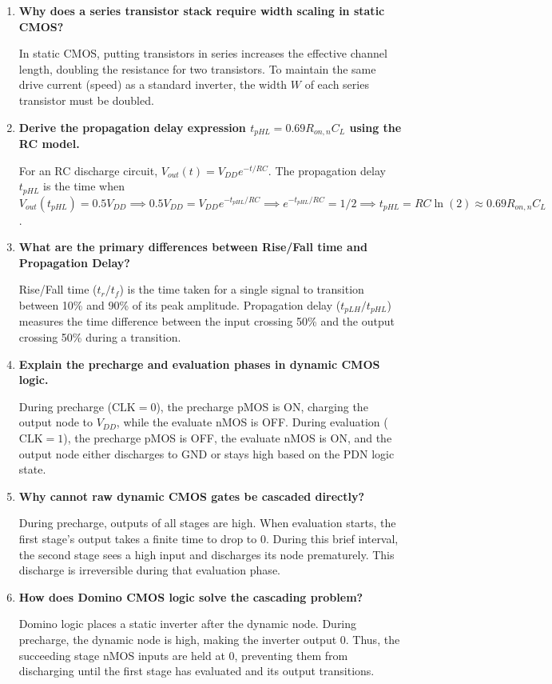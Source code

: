 \documentclass[12pt,a4paper]{article}
\newcommand{\Q}[1]{\textbf{#1}\par\noindent\ignorespaces}
\begin{document}
\begin{tcolorbox}[exambox, title={\textbf{Frequently Asked / Viva Questions}}]
\begin{enumerate}[topsep=0pt, label=\textbf{Q\arabic*.}, itemsep=5pt]
  \item \Q{Why does a series transistor stack require width scaling in static CMOS?}
    In static CMOS, putting transistors in series increases the effective channel length, doubling the resistance for two transistors. To maintain the same drive current (speed) as a standard inverter, the width $W$ of each series transistor must be doubled.
  \item \Q{Derive the propagation delay expression $t_{pHL} = 0.69 R_{on,n} C_L$ using the RC model.}
    For an RC discharge circuit, $V_{out}(t) = V_{DD} e^{-t/RC}$. The propagation delay $t_{pHL}$ is the time when $V_{out}(t_{pHL}) = 0.5 V_{DD} \implies 0.5 V_{DD} = V_{DD} e^{-t_{pHL}/RC} \implies e^{-t_{pHL}/RC} = 1/2 \implies t_{pHL} = RC \ln(2) \approx 0.69 R_{on,n} C_L$.
  \item \Q{What are the primary differences between Rise/Fall time and Propagation Delay?}
    Rise/Fall time ($t_r/t_f$) is the time taken for a single signal to transition between 10\% and 90\% of its peak amplitude. Propagation delay ($t_{pLH}/t_{pHL}$) measures the time difference between the input crossing 50\% and the output crossing 50\% during a transition.
  \item \Q{Explain the precharge and evaluation phases in dynamic CMOS logic.}
    During precharge ($\text{CLK} = 0$), the precharge pMOS is ON, charging the output node to $V_{DD}$, while the evaluate nMOS is OFF. During evaluation ($\text{CLK} = 1$), the precharge pMOS is OFF, the evaluate nMOS is ON, and the output node either discharges to GND or stays high based on the PDN logic state.
  \item \Q{Why cannot raw dynamic CMOS gates be cascaded directly?}
    During precharge, outputs of all stages are high. When evaluation starts, the first stage's output takes a finite time to drop to 0. During this brief interval, the second stage sees a high input and discharges its node prematurely. This discharge is irreversible during that evaluation phase.
  \item \Q{How does Domino CMOS logic solve the cascading problem?}
    Domino logic places a static inverter after the dynamic node. During precharge, the dynamic node is high, making the inverter output 0. Thus, the succeeding stage nMOS inputs are held at 0, preventing them from discharging until the first stage has evaluated and its output transitions.

\end{enumerate}
\end{tcolorbox}
\end{document}
